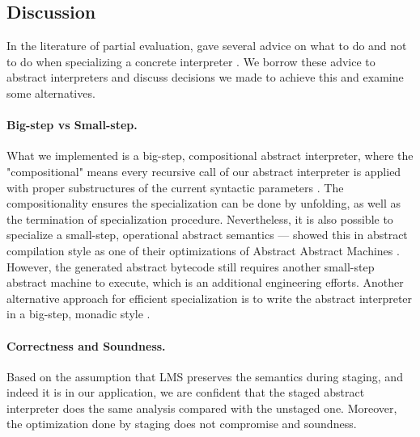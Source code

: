 \subsection{Discussion}
In the literature of partial evaluation, \citeauthor{10.1007/3-540-61580-6_11} gave several
advice on what to do and not to do when specializing a concrete interpreter \cite{10.1007/3-540-61580-6_11}. 
We borrow these advice to abstract interpreters and discuss decisions we made to achieve this 
and examine some alternatives.

\paragraph{Big-step vs Small-step.}
What we implemented is a big-step, compositional  abstract interpreter, 
where the "compositional" means every recursive call of our abstract interpreter is applied with proper 
substructures of the current syntactic parameters \cite{10.1007/3-540-61580-6_11}.
The compositionality ensures the specialization can be done by unfolding, as well as the termination of specialization procedure.
Nevertheless, it is also possible to specialize a small-step, operational abstract semantics --- \citeauthor{Johnson:2013:OAA:2500365.2500604}
showed this in abstract compilation \cite{Boucher:1996:ACN:647473.727587} style as one of their optimizations
of Abstract Abstract Machines \cite{Johnson:2013:OAA:2500365.2500604}. 
However, the generated abstract bytecode still requires another small-step abstract machine 
to execute, which is an additional engineering efforts.
Another alternative approach for efficient specialization is to write the abstract interpreter 
in a big-step, monadic style \cite{DBLP:journals/pacmpl/DaraisLNH17}.


\paragraph{Correctness and Soundness.}
Based on the assumption that LMS preserves the semantics during staging, and indeed it is 
in our application, 
we are confident that the staged abstract interpreter does the same analysis compared 
with the unstaged one. Moreover, the optimization done by staging does not compromise
and soundness.

